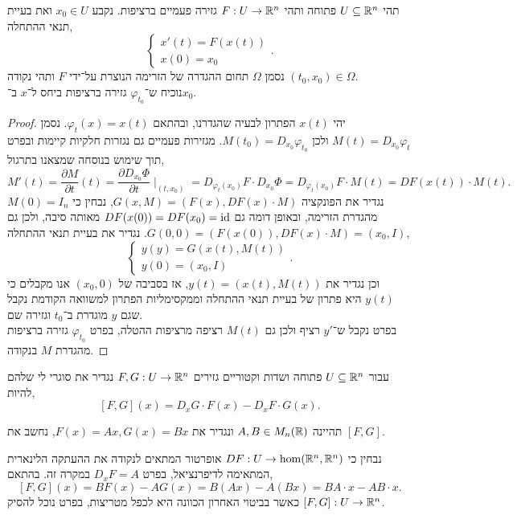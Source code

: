 \question{}
תהי $U \subseteq \mathbb{R}^n$ פתוחה ותהי $F : U \to \mathbb{R}^n$ גזירה פעמיים ברציפות. נקבע $x_0 \in U$ ואת בעיית תנאי ההתחלה,
\[
	\begin{cases}
		x'(t) = F(x(t)) \\
		x(0) = x_0
	\end{cases}
.\]
נסמן $\Omega$ תחום ההגדרה של הזרימה הנוצרת על־ידי $F$ ותהי נקודה $(t_0, x_0) \in \Omega$. \\
נוכיח ש־$\varphi_{t_0}$ גזירה ברציפות ביחס ל־$x$ ב־$x_0$.
\begin{proof}
	יהי $x(t)$ הפתרון לבעיה שהגדרנו, ובהתאם $\varphi_t(x) = x(t)$.
	נסמן $M(t) = D_{x_0} \varphi_t$ ולכן $M(t_0) = D_{x_0} \varphi_{t_0}$.
	מגזירות פעמיים גם נגזרות חלקיות קיימות ובפרט תוך שימוש בנוסחה שמצאנו בתרגול,
	\[
		M'(t)
		= \frac{\partial M}{\partial t}(t)
		= \frac{\partial D_{x_0} \Phi}{\partial t} \mid_{(t, x_0)}
		= D_{\varphi_t(x_0)} F \cdot D_{x_0} \Phi
		= D_{\varphi_t(x_0)} F \cdot M(t)
		= D F(x(t)) \cdot M(t)
	.\]
	נגדיר את הפונקציה $G(x, M) = (F(x), DF(x) \cdot M)$,
	נבחין כי $M(0) = I_n$ מהגדרת הזרימה, ובאופן דומה גם $DF(x(0)) = DF(x_0) = \operatorname{id}$ מאותה סיבה, ולכן גם $G(0, 0) = (F(x(0)), DF(x) \cdot M) = (x_0, I)$.
	נגדיר את בעיית תנאי ההתחלה,
	\[
		\begin{cases}
			y(y) = G(x(t), M(t)) \\
			y(0) = (x_0, I)
		\end{cases}
	.\]
	וכן נגדיר את $y(t) = (x(t), M(t))$, אז בסביבה של $(x_0, 0)$ אנו מקבלים כי $y(t)$ היא פתרון של בעיית תנאי ההתחלה וממקסימליות הפתרון למשוואה הקודמת נקבל שגם $y$ מוגדרת ב־$t_0$ וגזירה שם. \\
	בפרט נקבל ש־$y'$ רציף ולכן גם $M(t)$ רציפה מרציפות ההטלה, בפרט $\varphi_{t_0}$ גזירה ברציפות מהגדרת $M$ בנקודה.
\end{proof}

\question{}
עבור $U \subseteq \mathbb{R}^n$ פתוחה ושדות וקטוריים גזירים $F, G : U \to \mathbb{R}^n$ נגדיר את סוגרי לי שלהם להיות,
\[
	[F, G](x)
	= D_x G \cdot F(x) - D_x F \cdot G(x)
.\]

\subquestion{}
תהיינה $A, B \in M_n(\mathbb{R})$ ונגדיר את $F(x) = Ax, G(x) = Bx$,
נחשב את $[F, G]$.
\begin{solution}
	נבחין כי $DF : U \to \hom(\mathbb{R}^n, \mathbb{R}^n)$ אופרטור המתאים לנקודה את ההעתקה הלינארית המתאימה לדיפרנציאל, בפרט $D_x F = A$ במקרה זה.
	בהתאם,
	\[
		[F, G](x)
		= B F(x) - A G(x)
		= B(Ax) - A(Bx)
		= BA \cdot x - AB \cdot x
	.\]
	כאשר בביטוי האחרון הכוונה היא לכפל מטריצות, בפרט נוכל להסיק $[F, G] : U \to \mathbb{R}^n$.
\end{solution}

